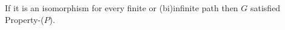 \documentclass[preview]{standalone}
\begin{document}
If it is an isomorphism for every finite or (bi)infinite path then $G$ satisfied Property-($P$).\\
\end{document}
